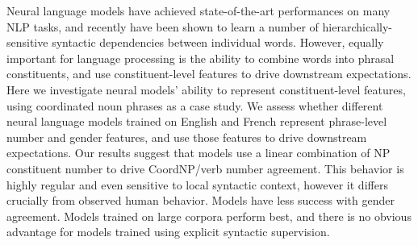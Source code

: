 Neural language models have achieved state-of-the-art performances on many NLP tasks, and recently have been shown to learn a number of hierarchically-sensitive syntactic dependencies between individual words. However, equally important for language processing is the ability to combine words into phrasal constituents, and use constituent-level features to drive downstream expectations. Here we investigate neural models' ability to represent constituent-level features, using coordinated noun phrases as a case study. We assess whether different neural language models trained on English and French represent phrase-level number and gender features, and use those features to drive downstream expectations. Our results suggest that models use a linear combination of NP constituent number to drive CoordNP/verb number agreement. This behavior is highly regular and even sensitive to local syntactic context, however it differs crucially from observed human behavior. Models have less success with gender agreement. Models trained on large corpora perform best, and there is no obvious advantage for models trained using explicit syntactic supervision.